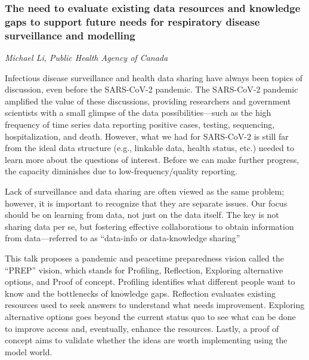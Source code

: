 \subsubsection*{The need to evaluate existing data resources and knowledge gaps to support future needs for respiratory disease surveillance and modelling}
\textit{Michael Li, Public Health Agency of Canada}

Infectious disease surveillance and health data sharing have always
been topics of discussion, even before the SARS-CoV-2 pandemic. The
SARS-CoV-2 pandemic amplified the value of these discussions,
providing researchers and government scientists with a small glimpse
of the data possibilities—such as the high frequency of time series
data reporting positive cases, testing, sequencing, hospitalization,
and death. However, what we had for SARS-CoV-2 is still far from the
ideal data structure (e.g., linkable data, health status, etc.) needed
to learn more about the questions of interest. Before we can make
further progress, the capacity diminishes due to low-frequency/quality
reporting.

Lack of surveillance and data sharing are often viewed as the same
problem; however, it is important to recognize that they are separate
issues.  Our focus should be on learning from data, not just on the
data itself. The key is not sharing data per se, but fostering
effective collaborations to obtain information from data—referred to
as ``data-info or data-knowledge sharing''

This talk proposes a pandemic and peacetime preparedness vision
called the ``PREP'' vision, which stands for Profiling, Reflection,
Exploring alternative options, and Proof of concept. Profiling
identifies what different people want to know and the bottlenecks of
knowledge gaps.  Reflection evaluates existing resources used to seek
answers to understand what needs improvement. Exploring alternative
options goes beyond the current status quo to see what can be done to
improve access and, eventually, enhance the resources. Lastly, a proof
of concept aims to validate whether the ideas are worth implementing
using the model world.